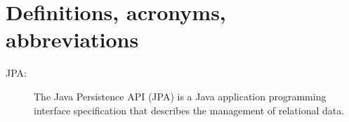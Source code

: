 \section{Definitions, acronyms, abbreviations}
\begin{description}
    \item[JPA:] The Java Persistence API (JPA) is a Java application programming interface specification that describes the management of relational data.
\end{description}
